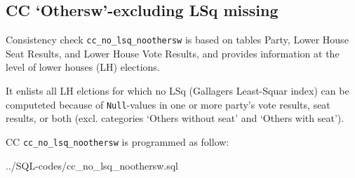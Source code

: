\subsection{CC `Othersw'-excluding LSq missing}\label{cc_no_lsq_noothersw}
Consistency check \texttt{\footnotesize cc\_no\_lsq\_noothersw} is based on tables Party, Lower House Seat Results, and Lower House Vote Results, and provides information at the level of lower houses (LH) elections. 

It enlists all LH elctions for which no LSq (Gallagers Least-Squar index) can be computeted because of \texttt{\footnotesize  Null}-values in one or more party's vote results, seat results, or both (excl. categories `Others without seat' and `Others with seat').

CC \texttt{\footnotesize cc\_no\_lsq\_noothersw} is programmed as follow: 

%
{../SQL-codes/cc_no_lsq_noothersw.sql}
